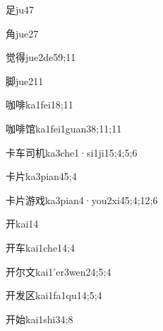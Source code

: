\begin{verbete}{足}{ju4}{7}
\end{verbete}
\begin{verbete}{角}{jue2}{7}
\end{verbete}
\begin{verbete}{觉得}{jue2de5}{9;11}
\end{verbete}
\begin{verbete}{脚}{jue2}{11}
\end{verbete}
\begin{verbete}{咖啡}{ka1fei1}{8;11}
\end{verbete}
\begin{verbete}{咖啡馆}{ka1fei1guan3}{8;11;11}
\end{verbete}
\begin{verbete}{卡车司机}{ka3che1·si1ji1}{5;4;5;6}
\end{verbete}
\begin{verbete}{卡片}{ka3pian4}{5;4}
\end{verbete}
\begin{verbete}{卡片游戏}{ka3pian4·you2xi4}{5;4;12;6}
\end{verbete}
\begin{verbete}{开}{kai1}{4}
\end{verbete}
\begin{verbete}{开车}{kai1che1}{4;4}
\end{verbete}
\begin{verbete}{开尔文}{kai1'er3wen2}{4;5;4}
\end{verbete}
\begin{verbete}{开发区}{kai1fa1qu1}{4;5;4}
\end{verbete}
\begin{verbete}{开始}{kai1shi3}{4;8}
\end{verbete}
